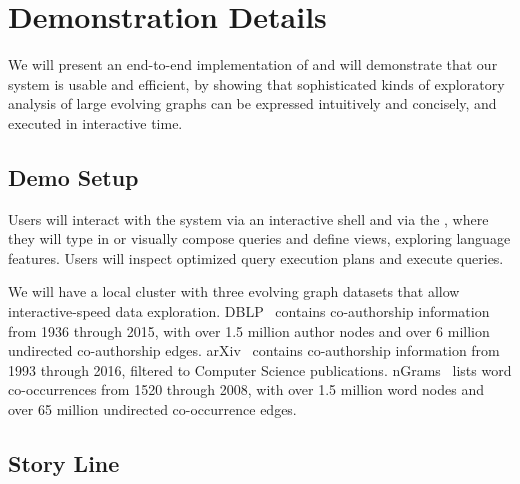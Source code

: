 \section{Demonstration Details}
\label{sec:demo}

We will present an end-to-end implementation of \ql and will
demonstrate that our system is usable and efficient, by showing that
sophisticated kinds of exploratory analysis of large evolving graphs
can be expressed intuitively and concisely, and executed in
interactive time.

\subsection{Demo Setup}
\label{sec:setup}

Users will interact with the \ql system via an interactive shell and
via the \qlui, where they will type in or visually compose queries and
define \tg views, exploring language features.  Users will inspect optimized query execution plans
and execute queries.

We will have a local cluster with three evolving graph datasets that
allow interactive-speed data exploration. DBLP~\cite{dblp} contains
co-authorship information from 1936 through 2015, with over 1.5
million author nodes and over 6 million undirected co-authorship
edges.  arXiv~\cite{arxiv} contains co-authorship information from
1993 through 2016, filtered to Computer Science publications.
nGrams~\cite{nGrams} lists word co-occurrences from 1520 through
2008, with over 1.5 million word nodes and over 65 million undirected
co-occurrence edges.  

\subsection{Story Line}
\label{sec:story}


